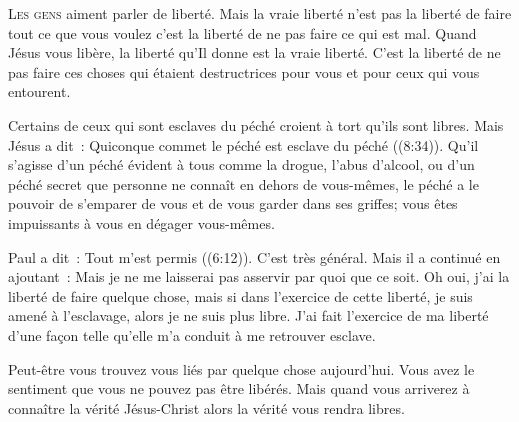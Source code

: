 




\lettrine{L}{es gens} aiment parler de liberté.
 Mais la vraie liberté n'est pas la liberté de faire tout ce que vous voulez
 \ocadr c'est la liberté de ne pas faire ce qui est mal.
 Quand Jésus vous libère, la liberté qu'Il donne est la vraie liberté.
 C'est la liberté de ne pas faire ces choses qui étaient destructrices
 pour vous et pour ceux qui vous entourent.

Certains de ceux qui sont esclaves du péché croient à tort qu'ils sont libres.
 Mais Jésus a dit~: 
 \og Quiconque commet le péché est esclave du péché \fg{}
 ((8:34)). Qu'il s'agisse d'un péché évident à tous
 comme la drogue, l'abus d'alcool, ou d'un péché secret que personne
 ne connaît en dehors de vous-mêmes, le péché a le pouvoir de s'emparer
 de vous et de vous garder dans ses griffes;
 vous êtes impuissants à vous en dégager vous-mêmes.


Paul a dit~: 
 \og Tout m'est permis \fg{} ((6:12)).
 C'est très général. Mais il a continué en ajoutant~: 
 \og Mais je ne me laisserai pas asservir par quoi que ce soit. \fg{}
 Oh oui, j'ai la liberté de faire quelque chose, mais si dans l'exercice
 de cette liberté, je suis amené à l'esclavage, alors je ne suis plus libre.
 J'ai fait l'exercice de ma liberté d'une façon telle qu'elle m'a conduit
 à me retrouver esclave.

Peut-être vous trouvez vous liés par quelque chose aujourd'hui.
 Vous avez le sentiment que vous ne pouvez pas être libérés.
 Mais quand vous arriverez à connaître la vérité
 \ocadr Jésus-Christ \fcadr{} alors la vérité vous rendra libres.

\dvrule


